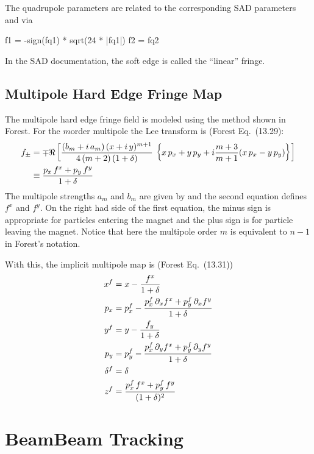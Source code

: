 The quadrupole parameters are related to the corresponding SAD parameters 
 and  via
\begin{example}
  f1 = -sign(fq1) * sqrt(24 * |fq1|)
  f2 = fq2
\end{example}
In the SAD documentation, the soft edge is called the ``linear'' fringe.

\subsection{Multipole Hard Edge Fringe Map}

The multipole hard edge fringe field is modeled using the method shown in
Forest\cite{b:forest}. For the $m$\Th order multipole the Lee transform 
is (Forest Eq.~(13.29):
\begin{align}
  f_\pm &= \mp \Re \left[ \frac{(b_m + i \, a_m) \, 
    (x + i \, y)^{m+1}}{4 \, (m + 2) \, (1 + \delta)} \,
    \left\{ x \, p_x + y \, p_y + i \frac{m+3}{m+1} 
    (x \, p_x - y \, p_y) \right\} \right] \nonumber \\
  &\equiv \frac{p_x \, f^x + p_y \, f^y}{1 + \delta}
\end{align}
The multipole strengths $a_m$ and $b_m$ are given by 
and the second equation defines $f^x$ and $f^y$. On the right had side of the first
equation, the minus sign is appropriate for particles entering the magnet and the
plus sign is for particle leaving the magnet.
Notice that here the multipole order $m$ is equivalent to $n-1$ in Forest's notation.

With this, the implicit multipole map is (Forest Eq.~(13.31))
\begin{align}
  x^f &= x - \frac{f^x}{1 + \delta} \nonumber \\
  p_x &= p_x^f - \frac{p_x^f \, \partial_x f^x + p_y^f \, \partial_x f^y}{1 + \delta} \nonumber \\
  y^f &= y - \frac{f_y}{1 + \delta} \\
  p_y &= p_y^f - \frac{p_x^f \, \partial_y f^x + p_y^f \, \partial_y f^y}{1 + \delta} \nonumber \\
  \delta^f &= \delta \nonumber \\
  z^f &=\frac{p_x^f \, f^x + p_y^f \, f^y}{(1 + \delta)^2} \nonumber
\end{align}

\section{BeamBeam Tracking}
\label{s:beambeam.std}

